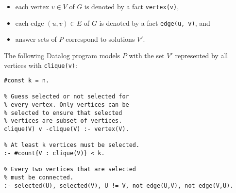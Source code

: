 \documentclass[11pt,a4paper]{article}
\theoremstyle{remark}
\begin{document}
\begin{itemize}
\item each vertex $v \in V$ of $G$ is denoted by a fact \texttt{vertex(v)},
\item each edge $(u, v) \in E$ of $G$ is denoted by a fact \texttt{edge(u, v)}, and
\item answer sets of $P$ correspond to solutions $V'$.
\end{itemize}

The following Datalog program models $P$ with the set $V'$ represented by all vertices with \texttt{clique(v)}:

\begin{lstlisting}[breaklines]
% Specify k.
#const k = n.

% Guess selected or not selected for
% every vertex. Only vertices can be
% selected to ensure that selected
% vertices are subset of vertices.
clique(V) v -clique(V) :- vertex(V).

% At least k vertices must be selected.
:- #count{V : clique(V)} < k.

% Every two vertices that are selected
% must be connected.
:- selected(U), selected(V), U != V, not edge(U,V), not edge(V,U).
\end{lstlisting}
\end{document}
